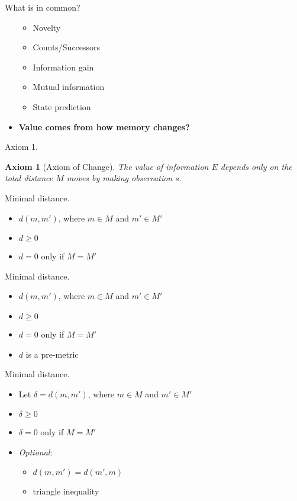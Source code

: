 \documentclass[10pt]{beamer}
\newtheorem{axiom}{Axiom}
\begin{document}
\begin{frame}[fragile]{What is in common?}
\begin{itemize}
    \begin{itemize}
    \item Novelty
    \item Counts/Successors
    \item Information gain
    \item Mutual information
    \item State prediction
    \end{itemize}
    \item \textbf{Value comes from how memory changes?}
\end{itemize}
\end{frame}

\begin{frame}[fragile]{Axiom 1.}
\begin{axiom}
    [Axiom of Change] The value of information $E$ depends only on the total distance $M$ moves by making observation $s$.
    \label{ax:1} 
\end{axiom}
\end{frame}

\begin{frame}[fragile]{Minimal distance.}
\begin{itemize}
    \item $d(m,m')$, where $m \in M$ and $m' \in M'$
    \item $d \ge 0$
    \item $d = 0$ only if $M = M'$
\end{itemize}
\end{frame}

\begin{frame}[fragile]{Minimal distance.}
\begin{itemize}
    \item $d(m,m')$, where $m \in M$ and $m' \in M'$
    \item $d \ge 0$
    \item $d = 0$ only if $M = M'$
    \item \alert{$d$ is a pre-metric}
\end{itemize}
\end{frame}

\begin{frame}[fragile]{Minimal distance.}
\begin{itemize}
    \item Let $\delta = d(m,m')$, where $m \in M$ and $m' \in M'$
    \item $\delta \ge 0$
    \item $\delta = 0$ only if $M = M'$
    \item \textit{Optional}: 
    \begin{itemize}
        \item $d(m,m') = d(m',m)$ 
        \item triangle inequality
    \end{itemize}
    
\end{itemize}
\end{frame}
\end{document}
